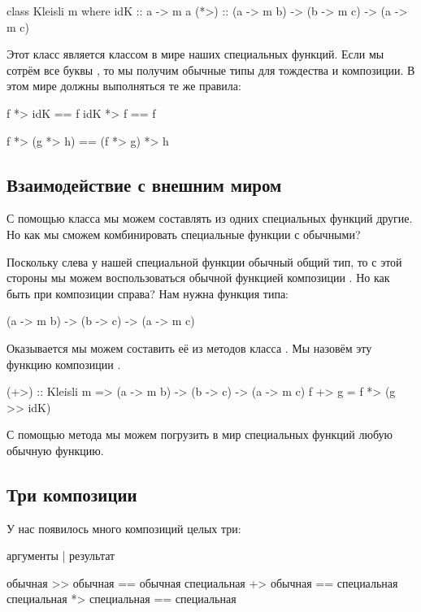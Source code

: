 \begin{code}
class Kleisli m where
    idK  :: a -> m a
    (*>) :: (a -> m b) -> (b -> m c) -> (a -> m c)    
\end{code}

Этот класс является классом  в мире наших специальных
функций. Если мы сотрём все буквы , то мы получим обычные типы для
тождества и композиции. В этом мире должны выполняться те же правила:


\begin{code}
f   *> idK  == f
idK *> f    == f

f *> (g *> h) == (f *> g) *> h
\end{code}

\subsection{Взаимодействие с внешним миром}

С помощью класса  мы можем составлять из одних специальных
функций другие. Но как мы сможем комбинировать специальные функции с
обычными?

Поскольку слева у нашей специальной функции обычный общий тип, то с этой
стороны мы можем воспользоваться обычной функцией композиции \In{>>}. Но
как быть при композиции справа? Нам нужна функция типа:


\begin{code}
(a -> m b) -> (b -> c) -> (a -> m c)
\end{code}

Оказывается мы можем составить её из методов класса . Мы
назовём эту функцию композиции \In{(+>)}.


\begin{code}
(+>) :: Kleisli m => (a -> m b) -> (b -> c) -> (a -> m c)
f +> g = f *> (g >> idK)
\end{code}

С помощью метода  мы можем погрузить в мир специальных функций
любую обычную функцию.

\subsection{Три композиции}

У нас появилось много композиций целых три:


\begin{code}
аргументы                           |   результат 

обычная         >>  обычная         ==  обычная
специальная     +>  обычная         ==  специальная
специальная     *>  специальная     ==  специальная
\end{code}

